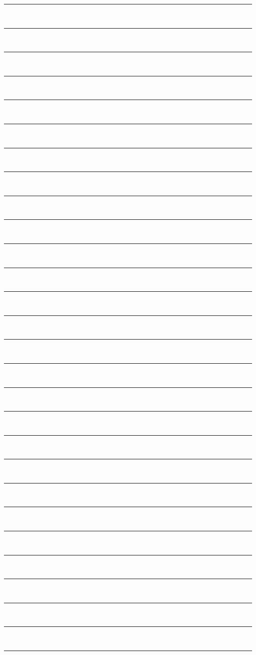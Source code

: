 \newpage
\noindent
\noindent\rule{\textwidth}{1pt}\\
\noindent\rule{\textwidth}{1pt}\\
\noindent\rule{\textwidth}{1pt}\\
\noindent\rule{\textwidth}{1pt}\\
\noindent\rule{\textwidth}{1pt}\\
\noindent\rule{\textwidth}{1pt}\\
\noindent\rule{\textwidth}{1pt}\\
\noindent\rule{\textwidth}{1pt}\\
\noindent\rule{\textwidth}{1pt}\\
\noindent\rule{\textwidth}{1pt}\\
\noindent\rule{\textwidth}{1pt}\\
\noindent\rule{\textwidth}{1pt}\\
\noindent\rule{\textwidth}{1pt}\\
\noindent\rule{\textwidth}{1pt}\\
\noindent\rule{\textwidth}{1pt}\\
\noindent\rule{\textwidth}{1pt}\\
\noindent\rule{\textwidth}{1pt}\\
\noindent\rule{\textwidth}{1pt}\\
\noindent\rule{\textwidth}{1pt}\\
\noindent\rule{\textwidth}{1pt}\\
\noindent\rule{\textwidth}{1pt}\\
\noindent\rule{\textwidth}{1pt}\\
\noindent\rule{\textwidth}{1pt}\\
\noindent\rule{\textwidth}{1pt}\\
\noindent\rule{\textwidth}{1pt}\\
\noindent\rule{\textwidth}{1pt}\\
\noindent\rule{\textwidth}{1pt}\\
\noindent\rule{\textwidth}{1pt}\\
